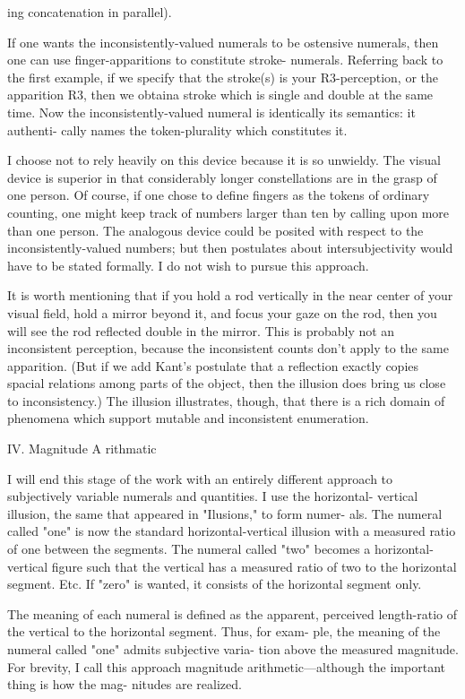 ing concatenation in parallel). 

If one wants the inconsistently-valued numerals to be ostensive 
numerals, then one can use finger-apparitions to constitute stroke- 
numerals. Referring back to the first example, if we specify that the 
stroke(s) is your R3-perception, or the apparition R3, then we obtaina 
stroke which is single and double at the same time. Now the 
inconsistently-valued numeral is identically its semantics: it authenti- 
cally names the token-plurality which constitutes it. 

I choose not to rely heavily on this device because it is so unwieldy. 
The visual device is superior in that considerably longer constellations 
are in the grasp of one person. Of course, if one chose to define fingers 
as the tokens of ordinary counting, one might keep track of numbers 
larger than ten by calling upon more than one person. The analogous 
device could be posited with respect to the inconsistently-valued 
numbers; but then postulates about intersubjectivity would have to be 
stated formally. I do not wish to pursue this approach. 

It is worth mentioning that if you hold a rod vertically in the near 
center of your visual field, hold a mirror beyond it, and focus your gaze 
on the rod, then you will see the rod reflected double in the mirror. This 
is probably not an inconsistent perception, because the inconsistent 
counts don't apply to the same apparition. (But if we add Kant's 
postulate that a reflection exactly copies spacial relations among parts 
of the object, then the illusion does bring us close to inconsistency.) The 
illusion illustrates, though, that there is a rich domain of phenomena 
which support mutable and inconsistent enumeration. 


IV. Magnitude A rithmatic 


I will end this stage of the work with an entirely different approach 
to subjectively variable numerals and quantities. I use the horizontal- 
vertical illusion, the same that appeared in "Ilusions," to form numer- 
als. The numeral called "one" is now the standard horizontal-vertical 
illusion with a measured ratio of one between the segments. The 
numeral called "two" becomes a horizontal-vertical figure such that the 
vertical has a measured ratio of two to the horizontal segment. Etc. If 
"zero" is wanted, it consists of the horizontal segment only. 

The meaning of each numeral is defined as the apparent, perceived 
length-ratio of the vertical to the horizontal segment. Thus, for exam- 
ple, the meaning of the numeral called "one" admits subjective varia- 
tion above the measured magnitude. For brevity, I call this approach 
magnitude arithmetic---although the important thing is how the mag- 
nitudes are realized. 


